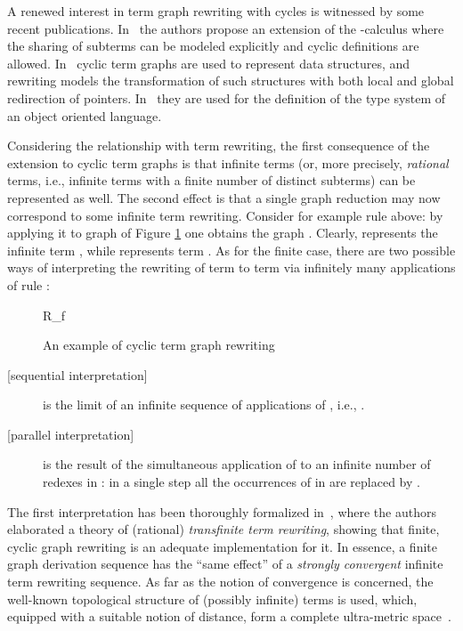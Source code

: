 \documentclass{eptcs}
\theoremstyle{plain}
\theoremstyle{definition}
\begin{document}
A renewed interest in term graph rewriting with cycles is witnessed by
some recent publications. In~\cite{DBLP:journals/mscs/BaldanBCK07,DBLP:journals/entcs/BaldanBCK08}
the authors propose an extension of the -calculus where the
sharing of subterms can be modeled explicitly and cyclic definitions
are allowed. In~\cite{DBLP:journals/entcs/DuvalEP07} cyclic term
graphs are used to represent data structures, 
and rewriting models the transformation of such structures with both
local and global redirection of pointers. In~\cite{DBLP:journals/mscs/DoughertyLL06}
they are used for the definition of the type system of an object
oriented language. 

Considering the relationship with term rewriting, the first 
consequence of the extension to cyclic term graphs is
that infinite terms (or, more precisely, \emph{rational} terms,
i.e., infinite terms with a finite number of distinct subterms) can
be represented as well. The second effect is that
a single graph reduction may now correspond to some infinite
term rewriting. Consider for example rule  above: by applying it
to  graph  of Figure \ref{fi:term-graph-2} one obtains the graph 
. Clearly, 
represents the infinite term , while 
represents term . As for the finite case, there are  
two possible ways of
interpreting the rewriting of term  to term  via
infinitely many applications of rule :

\begin{figure}
\centering

\hspace{1cm}
R_f
\hspace{1cm}

\caption[ ]{An example of cyclic term graph rewriting}
\label{fi:term-graph-2}
\end{figure}

\begin{description}
\item[{[sequential interpretation]}]
 is the limit of an infinite sequence of applications of
, i.e., .

\item[{[parallel interpretation]}]
 is the result of the simultaneous application of 
to an infinite number of redexes in : in a single step all
the occurrences of  in  are replaced by .
\end{description}

\noindent
The first interpretation has been thoroughly formalized in~\cite{DK:RRRR,DKP:INFP,FRW:CPCR,FW:RCTG,KKSV:AGRS}, where the authors
elaborated a theory of (rational) \emph{transfinite term rewriting},
showing that finite, cyclic graph rewriting is an adequate
implementation for it. In essence, a finite graph derivation sequence
has the ``same effect'' of a \emph{strongly convergent} infinite
term rewriting sequence. As far as the notion of convergence is
concerned, the well-known topological structure of (possibly infinite)
terms is used, which, equipped with a suitable notion of distance,
form a complete ultra-metric space~\cite{AN:MSIT}.
\end{document}
